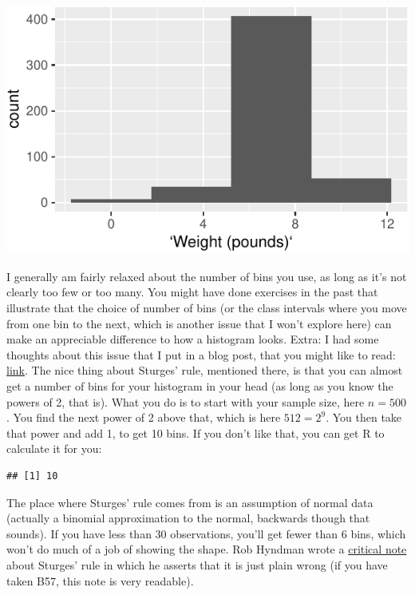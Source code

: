 \documentclass[]{tufte-book}
\newenvironment{Shaded}{}{}
\newcommand{\DataTypeTok}[1]{\textcolor[rgb]{0.56,0.13,0.00}{#1}}
\newcommand{\KeywordTok}[1]{\textcolor[rgb]{0.00,0.44,0.13}{\textbf{#1}}}
\newcommand{\NormalTok}[1]{#1}
\newcommand{\OperatorTok}[1]{\textcolor[rgb]{0.40,0.40,0.40}{#1}}
\newcommand{\StringTok}[1]{\textcolor[rgb]{0.25,0.44,0.63}{#1}}
\theoremstyle{definition}
\theoremstyle{definition}
\theoremstyle{definition}
\theoremstyle{remark}
\begin{document}
\includegraphics{03-data-summaries_files/figure-latex/unnamed-chunk-11-1}

I generally am fairly relaxed about the number of bins you use, as long
as it's not clearly too few or too many. You might have done exercises
in the past that illustrate that the choice of number of bins (or the
class intervals where you move from one bin to the next, which is
another issue that I won't explore here) can make an appreciable
difference to how a histogram looks. Extra: I had some thoughts about
this issue that I put in a blog post, that you might like to read:
\href{http://ritsokiguess.site/docs/2017/06/08/histograms-and-bins/}{link}.
The nice thing about Sturges' rule, mentioned there, is that you can
almost get a number of bins for your histogram in your head (as long as
you know the powers of 2, that is). What you do is to start with your
sample size, here \(n=500\). You find the next power of 2 above that,
which is here \(512=2^9\). You then take that power and add 1, to get 10
bins. If you don't like that, you can get R to calculate it for you:

\begin{Shaded}
\end{Shaded}

\begin{verbatim}
## [1] 10
\end{verbatim}

The place where Sturges' rule comes from is an assumption of normal data
(actually a binomial approximation to the normal, backwards though that
sounds). If you have less than 30 observations, you'll get fewer than 6
bins, which won't do much of a job of showing the shape. Rob Hyndman
wrote a \href{https://robjhyndman.com/papers/sturges.pdf}{critical note}
about Sturges' rule in which he asserts that it is just plain wrong (if
you have taken B57, this note is very readable).
\end{document}
